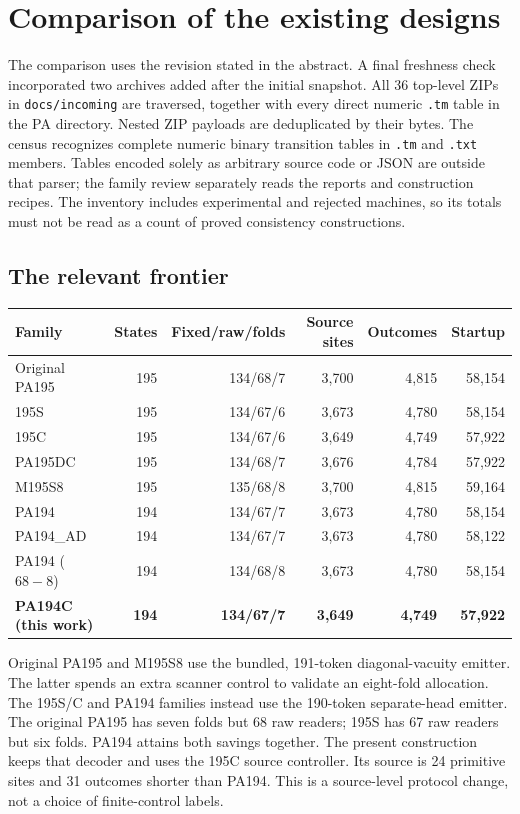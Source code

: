\documentclass[11pt]{article}
\newcommand{\file}[1]{{\small\nolinkurl{#1}}}
\begin{document}
\section{Comparison of the existing designs}\label{sec:corpus}

The comparison uses the revision stated in the abstract. A final freshness
check incorporated two archives added after the initial snapshot. All 36
top-level ZIPs in \file{docs/incoming} are traversed, together with every
direct numeric \file{.tm} table in the PA directory. Nested ZIP payloads
are deduplicated by their bytes. The census recognizes complete numeric
binary transition tables in \file{.tm} and \file{.txt} members. Tables
encoded solely as arbitrary source code or JSON are outside that parser;
the family review separately reads the reports and construction recipes.
The inventory includes experimental and rejected machines, so its totals
must not be read as a count of proved consistency constructions.



\subsection{The relevant frontier}

\begin{center}\small
\begin{tabular}{@{}lrrrrr@{}}
\toprule
Family&States&Fixed/raw/folds&Source sites&Outcomes&Startup\\
\midrule
Original PA195&195&134/68/7&3,700&4,815&58,154\\
195S&195&134/67/6&3,673&4,780&58,154\\
195C&195&134/67/6&3,649&4,749&57,922\\
PA195DC&195&134/68/7&3,676&4,784&57,922\\
M195S8&195&135/68/8&3,700&4,815&59,164\\
PA194&194&134/67/7&3,673&4,780&58,154\\
PA194\_AD&194&134/67/7&3,673&4,780&58,122\\
PA194 ($68-8$)&194&134/68/8&3,673&4,780&58,154\\
\textbf{PA194C (this work)}&\textbf{194}&\textbf{134/67/7}&\textbf{3,649}&\textbf{4,749}&\textbf{57,922}\\
\bottomrule
\end{tabular}
\end{center}

Original PA195 and M195S8 use the bundled, 191-token diagonal-vacuity
emitter. The latter spends an extra scanner control to validate an
eight-fold allocation. The 195S/C and PA194 families instead use the
190-token separate-head emitter. The original PA195 has seven folds but
68 raw readers; 195S has 67 raw readers but six folds. PA194 attains both
savings together. The present construction keeps that decoder and uses
the 195C source controller. Its source is 24 primitive sites and 31
outcomes shorter than PA194. This is a source-level protocol change, not
a choice of finite-control labels.
\end{document}
